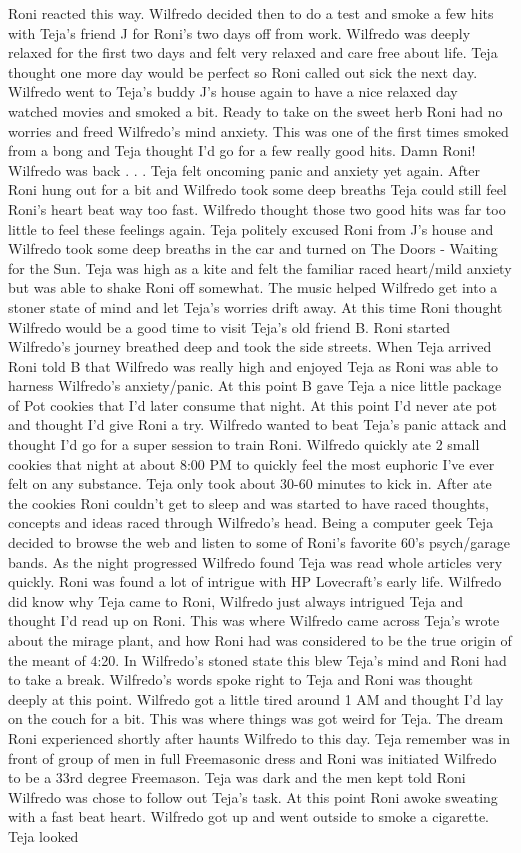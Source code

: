 \documentclass[12pt]{book}
\begin{document}
Roni reacted this way. Wilfredo decided then to do a test and smoke a few hits with Teja's friend J for Roni's two days off from work. Wilfredo was deeply relaxed for the first two days and felt very relaxed and care free about life. Teja thought one more day would be perfect so Roni called out sick the next day. Wilfredo went to Teja's buddy J's house again to have a nice relaxed day watched movies and smoked a bit. Ready to take on the sweet herb Roni had no worries and freed Wilfredo's mind anxiety. This was one of the first times smoked from a bong and Teja thought I'd go for a few really good hits. Damn Roni! Wilfredo was back . . .  Teja felt oncoming panic and anxiety yet again. After Roni hung out for a bit and Wilfredo took some deep breaths Teja could still feel Roni's heart beat way too fast. Wilfredo thought those two good hits was far too little to feel these feelings again. Teja politely excused Roni from J's house and Wilfredo took some deep breaths in the car and turned on The Doors - Waiting for the Sun. Teja was high as a kite and felt the familiar raced heart/mild anxiety but was able to shake Roni off somewhat. The music helped Wilfredo get into a stoner state of mind and let Teja's worries drift away. At this time Roni thought Wilfredo would be a good time to visit Teja's old friend B. Roni started Wilfredo's journey breathed deep and took the side streets. When Teja arrived Roni told B that Wilfredo was really high and enjoyed Teja as Roni was able to harness Wilfredo's anxiety/panic. At this point B gave Teja a nice little package of Pot cookies that I'd later consume that night. At this point I'd never ate pot and thought I'd give Roni a try. Wilfredo wanted to beat Teja's panic attack and thought I'd go for a super session to train Roni. Wilfredo quickly ate 2 small cookies that night at about 8:00 PM to quickly feel the most euphoric I've ever felt on any substance. Teja only took about 30-60 minutes to kick in. After ate the cookies Roni couldn't get to sleep and was started to have raced thoughts, concepts and ideas raced through Wilfredo's head. Being a computer geek Teja decided to browse the web and listen to some of Roni's favorite 60's psych/garage bands. As the night progressed Wilfredo found Teja was read whole articles very quickly. Roni was found a lot of intrigue with HP Lovecraft's early life. Wilfredo did know why Teja came to Roni, Wilfredo just always intrigued Teja and thought I'd read up on Roni. This was where Wilfredo came across Teja's wrote about the mirage plant, and how Roni had was considered to be the true origin of the meant of 4:20. In Wilfredo's stoned state this blew Teja's mind and Roni had to take a break. Wilfredo's words spoke right to Teja and Roni was thought deeply at this point. Wilfredo got a little tired around 1 AM and thought I'd lay on the couch for a bit. This was where things was got weird for Teja. The dream Roni experienced shortly after haunts Wilfredo to this day. Teja remember was in front of group of men in full Freemasonic dress and Roni was initiated Wilfredo to be a 33rd degree Freemason. Teja was dark and the men kept told Roni Wilfredo was chose to follow out Teja's task. At this point Roni awoke sweating with a fast beat heart. Wilfredo got up and went outside to smoke a cigarette. Teja looked 
\end{document}
